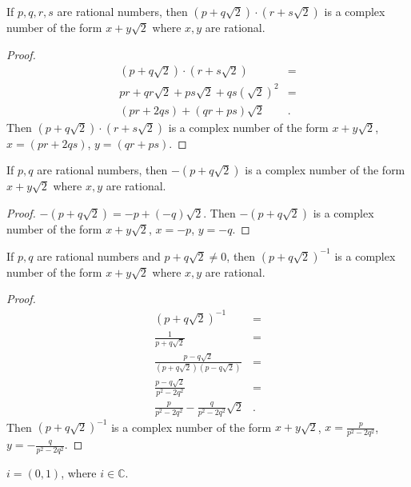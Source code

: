 \documentclass[12pt]{article}
\begin{document}
\begin{lemma}
  If $p,q,r,s$ are rational numbers, then $(p + q\sqrt{2})
  \cdot (r + s\sqrt{2})$ is a complex number of the form $x +
  y\sqrt{2}$ where $x, y$ are rational.
  \begin{proof}
    \begin{align*}
      (p + q\sqrt{2}) \cdot (r + s\sqrt{2}) &=\\
      pr + qr\sqrt{2} + ps\sqrt{2} + qs(\sqrt{2})^{2} &=\\
      (pr + 2qs) + (qr + ps)\sqrt{2}&.
    \end{align*}
    Then $(p + q\sqrt{2}) \cdot (r + s\sqrt{2})$ is a complex
    number of the form $x + y\sqrt{2}$, $x = (pr + 2qs)$, $y =
    (qr + ps)$.
  \end{proof}
\end{lemma}

\begin{lemma}
  If $p,q$ are rational numbers, then $-(p + q\sqrt{2})$ is a
  complex number of the form $x + y\sqrt{2}$ where $x, y$ are
  rational.
  \begin{proof}
    $-(p + q\sqrt{2}) = -p + (-q)\sqrt{2}$. Then $-(p +
    q\sqrt{2})$ is a complex number of the form $x + y\sqrt{2}$,
    $x = -p$, $y = -q$.
  \end{proof}
\end{lemma}

\begin{lemma}
  If $p,q$ are rational numbers and $p + q\sqrt{2} \neq 0$, then
  $(p + q\sqrt{2})^{-1}$ is a complex number of the form $x +
  y\sqrt{2}$ where $x, y$ are rational.
  \begin{proof}
    \begin{align*}
      (p + q\sqrt{2})^{-1} &=\\
      \frac{1}{p + q\sqrt{2}} &=\\
      \frac{p - q\sqrt{2}}{(p + q\sqrt{2})(p - q\sqrt{2})} &=\\
      \frac{p - q\sqrt{2}}{p^{2} - 2q^{2}} &=\\
      \frac{p}{p^{2} - 2q^{2}} - \frac{q}{p^{2} - 2q^{2}}\sqrt{2}&.
    \end{align*}
    Then $(p + q\sqrt{2})^{-1}$ is a complex number of the form
    $x + y\sqrt{2}$, $x = \frac{p}{p^{2} - 2q^{2}}$, $y =
    -\frac{q}{p^{2} - 2q^{2}}$.
  \end{proof}
\end{lemma}

\begin{defn}
  $i = (0,1)$, where $i \in \mathbb{C}$.
\end{defn}
\end{document}
